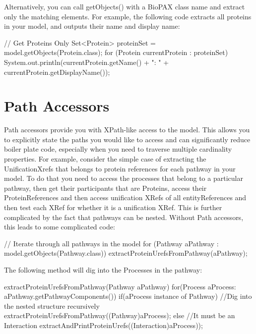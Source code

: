 \documentclass{tufte-book}
\begin{document}
Alternatively, you can call getObjects() with a BioPAX class name and extract only the matching elements. For example, the following code extracts all proteins in your model, and outputs their name and display name:

\begin{javacode}
// Get Proteins Only
Set<Protein> proteinSet = model.getObjects(Protein.class);
for (Protein currentProtein : proteinSet)
{
	System.out.println(currentProtein.getName() +
	 ": " + currentProtein.getDisplayName());
}
\end{javacode}

\section{Path Accessors}
Path accessors provide you with XPath-like access to the model. This allows you to explicitly state the paths you would like to access and can significantly reduce boiler plate code, especially when you need to traverse multiple cardinality properties. For example, consider the simple case of extracting the UnificationXrefs that belongs to protein references for each pathway in your model. To do that you need to access the processes that belong to a particular pathway, then get their participants  that are Proteins, access their ProteinReferences and then access unification XRefs of all entityReferences and then test each XRef for whether it is a unification XRef.  This is further complicated by the fact that pathways can be nested. Without Path accessors, this leads to some complicated code:

\begin{javacode}

// Iterate through all pathways in the model
 for (Pathway aPathway : model.getObjects(Pathway.class))
  extractProteinUrefsFromPathway(aPathway);
\end{javacode}

The following method will dig into the Processes in the pathway:  

\begin{javacode}
extractProteinUrefsFromPathway(Pathway aPathway)
{
 for(Process aProcess: aPathway.getPathwayComponents()) 
 {
  if(aProcess instance of Pathway)
  { //Dig into the nested structure recursively
   extractProteinUrefsFromPathway((Pathway)aProcess);
  }  else
  { //It must be an Interaction
   extractAndPrintProteinUrefs((Interaction)aProcess));
  }}}
\end{javacode}
\end{document}
